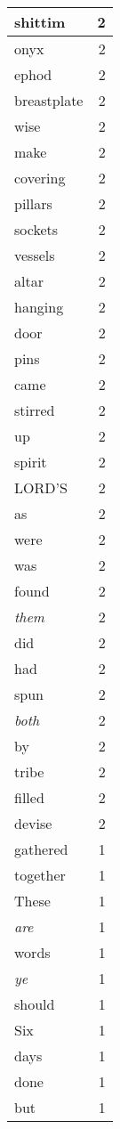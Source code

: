 \begin{center}
\begin{longtable}{l|r}
shittim & 2 \\ \hline
onyx & 2 \\ \hline
ephod & 2 \\ \hline
breastplate & 2 \\ \hline
wise & 2 \\ \hline
make & 2 \\ \hline
covering & 2 \\ \hline
pillars & 2 \\ \hline
sockets & 2 \\ \hline
vessels & 2 \\ \hline
altar & 2 \\ \hline
hanging & 2 \\ \hline
door & 2 \\ \hline
pins & 2 \\ \hline
came & 2 \\ \hline
stirred & 2 \\ \hline
up & 2 \\ \hline
spirit & 2 \\ \hline
LORD'S & 2 \\ \hline
as & 2 \\ \hline
were & 2 \\ \hline
was & 2 \\ \hline
found & 2 \\ \hline
\emph{them} & 2 \\ \hline
did & 2 \\ \hline
had & 2 \\ \hline
spun & 2 \\ \hline
\emph{both} & 2 \\ \hline
by & 2 \\ \hline
tribe & 2 \\ \hline
filled & 2 \\ \hline
devise & 2 \\ \hline
gathered & 1 \\ \hline
together & 1 \\ \hline
These & 1 \\ \hline
\emph{are} & 1 \\ \hline
words & 1 \\ \hline
\emph{ye} & 1 \\ \hline
should & 1 \\ \hline
Six & 1 \\ \hline
days & 1 \\ \hline
done & 1 \\ \hline
but & 1 \\ \hline

\end{longtable}
\end{center}
